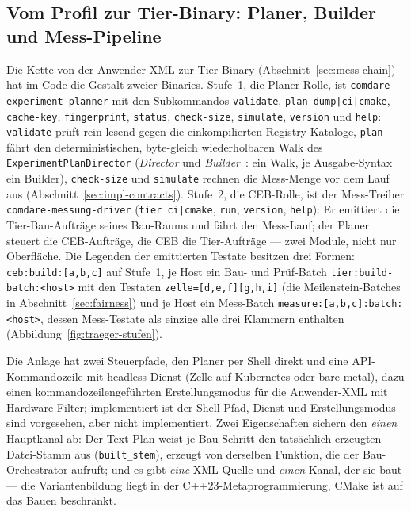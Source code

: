 \begin{nurkurz}
\subsection{Vom Profil zur Tier-Binary: Planer, Builder und Mess-Pipeline}\label{sec:impl-pipeline}
Die Kette von der Anwender-XML zur Tier-Binary (Abschnitt~\ref{sec:mess-chain}) hat im Code die Gestalt
zweier Binaries. Stufe~1, die Planer-Rolle, ist \texttt{comdare-experiment-planner} mit den Subkommandos
\texttt{validate}, \texttt{plan dump|ci|cmake}, \texttt{cache-key}, \texttt{fingerprint}, \texttt{status},
\texttt{check-size}, \texttt{simulate}, \texttt{version} und \texttt{help}: \texttt{validate} prüft rein
lesend gegen die einkompilierten Registry-Kataloge, \texttt{plan} fährt den deterministischen, byte-gleich
wiederholbaren Walk des \texttt{ExperimentPlanDirector} (\emph{Director} und
\emph{Builder}~\cite{gamma1994patterns}: ein Walk, je Ausgabe-Syntax ein Builder), \texttt{check-size} und
\texttt{simulate} rechnen die Mess-Menge vor dem Lauf aus (Abschnitt~\ref{sec:impl-contracts}). Stufe~2,
die CEB-Rolle, ist der Mess-Treiber \texttt{comdare-messung-driver} (\texttt{tier ci|cmake}, \texttt{run},
\texttt{version}, \texttt{help}): Er emittiert die Tier-Bau-Aufträge seines Bau-Raums und fährt den
Mess-Lauf; der Planer steuert die CEB-Aufträge, die CEB die Tier-Aufträge --- zwei Module, nicht nur
Oberfläche. Die Legenden der emittierten Testate besitzen drei Formen: \texttt{ceb:build:[a,b,c]} auf
Stufe~1, je Host ein Bau- und Prüf-Batch \texttt{tier:build-batch:<host>} mit den Testaten
\texttt{zelle=[d,e,f][g,h,i]} (die Meilenstein-Batches in Abschnitt~\ref{sec:fairness}) und je Host ein
Mess-Batch \texttt{measure:[a,b,c]:batch:<host>}, dessen Mess-Testate als einzige alle drei Klammern
enthalten (Abbildung~\ref{fig:traeger-stufen}).

Die Anlage hat zwei Steuerpfade, den Planer per Shell direkt und eine API-Kommandozeile mit headless
Dienst (Zelle auf Kubernetes oder bare metal), dazu einen kommandozeilengeführten Erstellungsmodus für die
Anwender-XML mit Hardware-Filter; implementiert ist der Shell-Pfad, Dienst und Erstellungsmodus sind
vorgesehen, aber nicht implementiert. Zwei Eigenschaften sichern den \emph{einen} Hauptkanal ab: Der
Text-Plan weist je Bau-Schritt den tatsächlich erzeugten Datei-Stamm aus (\texttt{built\_stem}), erzeugt
von derselben Funktion, die der Bau-Orchestrator aufruft; und es gibt \emph{eine} XML-Quelle und
\emph{einen} Kanal, der sie baut --- die Variantenbildung liegt in der C++23-Metaprogrammierung, CMake ist
auf das Bauen beschränkt.


\end{nurkurz}
